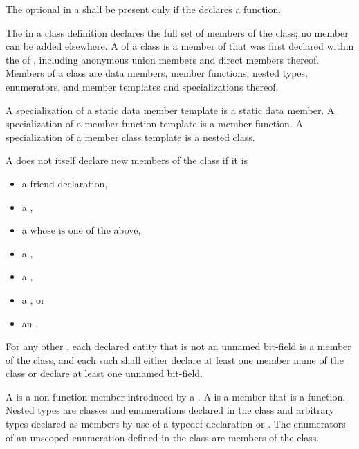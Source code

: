 \pnum
The optional 
in a 
shall be present only if
the  declares a function.

\pnum
{}%
The  in a class definition declares the
full set of members of the class; no member can be added elsewhere.
A  of a class  is a member of 
that was first declared within the  of ,
including anonymous union members and direct members thereof.
Members of a class are data members, member
functions, nested types, enumerators,
and member templates and specializations thereof.
\begin{note}
A specialization of a static data member template is a static data member.
A specialization of a member function template is a member function.
A specialization of a member class template is a nested class.
\end{note}

\pnum
A  does not itself declare new members of the class
if it is
\begin{itemize}
\item a friend declaration,
\item a ,
\item a  whose  is one of the above,
\item a ,
\item a ,
\item a , or
\item an .
\end{itemize}
For any other ,
each declared entity
that is not an unnamed bit-field
is a member of the class,
and each such 
shall either
declare at least one member name of the class
or declare at least one unnamed bit-field.

\pnum
A  is a non-function member introduced by a
.
A  is a member that is a function.
Nested types are classes and
enumerations declared in the class and arbitrary types
declared as members by use of a typedef declaration
or .
The enumerators of an unscoped enumeration defined in the class
are members of the class.

